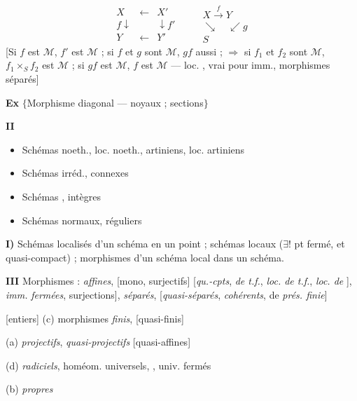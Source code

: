 \documentclass[11pt,a4paper]{article}
\begin{document}
\[
\begin{array}{ccc} X & \longleftarrow & X' \\ {\scriptstyle f}\downarrow & & \downarrow{\scriptstyle f'} \\ Y & \longleftarrow & Y' \end{array}
\qquad
\begin{array}{c} X \xrightarrow{\ f\ } Y \\ \searrow \quad \swarrow{\scriptstyle g} \\ S \end{array}
\]
[Si $f$ est $\mathcal{M}$, $f'$ est $\mathcal{M}$ ; si $f$ et $g$ sont $\mathcal{M}$, $gf$ aussi ; $\Rightarrow$ si $f_1$ et $f_2$ sont $\mathcal{M}$, $f_1 \times_S f_2$ est $\mathcal{M}$ ; si $gf$ est $\mathcal{M}$, $f$ est $\mathcal{M}$ --- loc. , \struck{\ill{}} vrai pour imm., morphismes séparés]

\textbf{Ex} $\{$Morphisme diagonal --- noyaux ; sections$\}$

\textbf{II}

\begin{itemize}
  \item Schémas noeth., loc. noeth., artiniens, loc. artiniens
  \item Schémas irréd., connexes
  \item Schémas , intègres
  \item Schémas normaux, réguliers
\end{itemize}

\textbf{I)} Schémas localisés d'un \struck{\ill{}} schéma en un point ; schémas locaux ($\exists !$ pt fermé, et quasi-compact) ; morphismes d'un schéma local dans un schéma.

\textbf{III} Morphismes : \emph{affines}, [mono, surjectifs] [\emph{qu.-cpts}, \emph{de t.f.}, \emph{loc. de t.f.}, \emph{loc. de} \ill{}], \emph{imm.}  \emph{fermées}, surjections], \emph{séparés}, [\emph{quasi-séparés}, \emph{cohérents}, de \emph{prés. finie}]

[entiers] (c) morphismes \emph{finis}, [quasi-finis] \struck{\ill{}}

(a) \emph{projectifs}, \emph{quasi-projectifs} [quasi-affines]

(d) \emph{radiciels}, homéom. universels, , univ. fermés

(b) \emph{propres}
\end{document}
